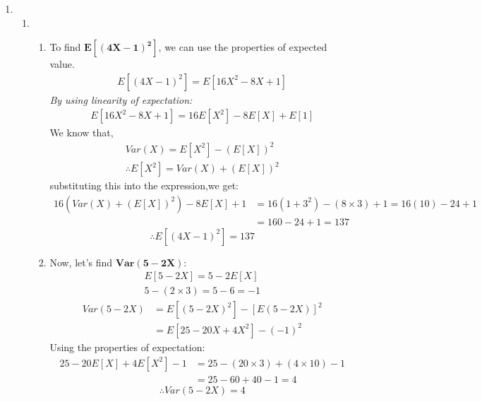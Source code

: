 \documentclass{article}
\begin{document}
\begin{enumerate}
\newpage
\item
    \begin{enumerate}
    \item 
        \begin{enumerate}
        \item
            To find \(\mathbf{E[(4X - 1)^2]}\), we can use the properties of expected value.
            \begin{align*}
                E[(4X - 1)^2] = E[16X^2 - 8X + 1]
            \end{align*}
            \textit{By using linearity of expectation:}
            \begin{align*}
                E[16X^2 - 8X + 1] = 16E[X^2] - 8E[X] + E[1]
            \end{align*}
            We know that,
            \begin{align*}
                Var(X) = E[X^2] - (E[X])^2\\
                \therefore E[X^2] = Var(X) + (E[X])^2
            \end{align*}
            substituting this into the expression,we get:
            \begin{align*}
                16(Var(X) + (E[X])^2) - 8E[X] + 1 &= 16(1 + 3^2) - (8 \times 3) + 1 = 16(10) - 24 + 1\\
                &= 160 - 24 + 1 = 137
            \end{align*}
            \[
                \boxed{\therefore E\left[(4X - 1)^2\right] = 137}
            \]
        \item
            Now, let's find \(\mathbf{Var(5 - 2X)}\):
            \begin{align*}
                E[5 - 2X] = 5 - 2E[X]\\
                5 - (2 \times 3) = 5 - 6 = -1
            \end{align*}
            \begin{align*}
                Var(5 - 2X) &= E[(5 - 2X)^2] - [E(5 - 2X)]^2\\
                &= E[25 - 20X + 4X^2] - (-1)^2
            \end{align*}
            Using the properties of expectation:
            \begin{align*}
                25 - 20E[X] + 4E[X^2] - 1 &= 25 - (20 \times 3) + (4 \times 10) - 1
                \\ &= 25 - 60 + 40 - 1 = 4
            \end{align*}
            \[
                \boxed{\therefore Var(5 - 2X) = 4}
\]
\end{enumerate}
\end{enumerate}
\end{enumerate}
\end{document}
